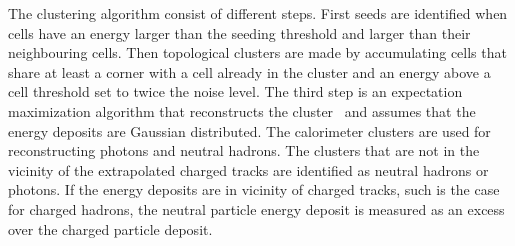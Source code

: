 The clustering algorithm consist of different steps. First seeds are identified when cells have an energy larger than the seeding threshold and larger than their neighbouring cells. Then topological clusters are made by accumulating cells that share at least a corner with a cell already in the cluster and an energy above a cell threshold set to twice the noise level. The third step is an expectation maximization algorithm that reconstructs the cluster~\cite{CMS-PRF-14-001} and assumes that  the energy deposits are Gaussian distributed. The calorimeter clusters are used for reconstructing photons and neutral hadrons. The  clusters that are not in the vicinity of the extrapolated charged tracks are identified as neutral hadrons or photons. If the energy deposits are in vicinity of charged tracks, such is the case for charged hadrons, the neutral particle energy deposit is measured as an excess over the charged particle deposit. %

%



